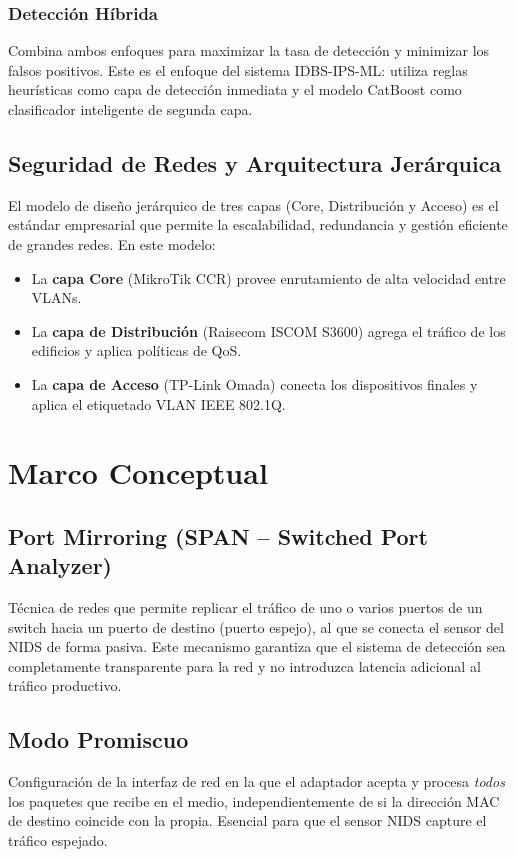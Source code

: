 \documentclass[12pt, letterpaper, oneside]{report}
\begin{document}
\subsubsection{Detección Híbrida}
Combina ambos enfoques para maximizar la tasa de detección y minimizar los falsos positivos. Este es el enfoque del sistema \textsc{IDBS-IPS-ML}: utiliza reglas heurísticas como capa de detección inmediata y el modelo CatBoost como clasificador inteligente de segunda capa.

\subsection{Seguridad de Redes y Arquitectura Jerárquica}

El modelo de diseño jerárquico de tres capas (Core, Distribución y Acceso) es el estándar empresarial que permite la escalabilidad, redundancia y gestión eficiente de grandes redes. En este modelo:

\begin{itemize}[leftmargin=*]
  \item La \textbf{capa Core} (MikroTik CCR) provee enrutamiento de alta velocidad entre VLANs.
  \item La \textbf{capa de Distribución} (Raisecom ISCOM S3600) agrega el tráfico de los edificios y aplica políticas de QoS.
  \item La \textbf{capa de Acceso} (TP-Link Omada) conecta los dispositivos finales y aplica el etiquetado VLAN IEEE 802.1Q.
\end{itemize}

\section{Marco Conceptual}

\subsection{Port Mirroring (SPAN -- Switched Port Analyzer)}
Técnica de redes que permite replicar el tráfico de uno o varios puertos de un switch hacia un puerto de destino (puerto espejo), al que se conecta el sensor del NIDS de forma pasiva. Este mecanismo garantiza que el sistema de detección sea completamente transparente para la red y no introduzca latencia adicional al tráfico productivo.

\subsection{Modo Promiscuo}
Configuración de la interfaz de red en la que el adaptador acepta y procesa \textit{todos} los paquetes que recibe en el medio, independientemente de si la dirección MAC de destino coincide con la propia. Esencial para que el sensor NIDS capture el tráfico espejado.
\end{document}
